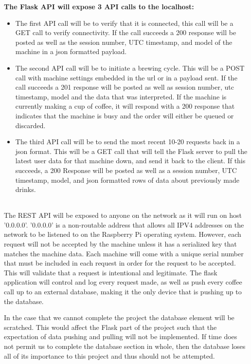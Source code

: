 \documentclass[conference]{IEEEtran}
\begin{document}
\indent\textbf{The Flask API will expose 3 API calls to the localhost:} \\ 
\begin{itemize}
\item The first API call will be to verify that it is connected, this call will
be a GET call to verify connectivity. If the call succeeds a 200 response will
be posted as well as the session number, UTC timestamp, and model of the
machine in a json formatted payload.
\item The second API call will be to initiate a brewing cycle. This will be a
POST call with machine settings embedded in the url or in a payload sent. If the
call succeeds a 201 response will be posted as well as session number, utc
timestamp, model and the data that was interpreted. If the machine is currently
making a cup of coffee, it will respond with a 200 response that indicates that
the machine is busy and the order will either be queued or discarded.
\item The third API call will be to send the most recent 10-20 requests back in
a json format. This will be a GET call that will tell the Flask server to pull
the latest user data for that machine down, and send it back to the client. If
this succeeds, a 200 Response will be posted as well as a session number, UTC
timestamp, model, and json formatted rows of data about previously made drinks.
\end{itemize}
\ \\

The REST API will be exposed to anyone on the network as it will run on host
'0.0.0.0'. '0.0.0.0' is a non-routable address that allows all IPV4 addresses
on the network to be listened to on the Raspberry Pi operating system.
However, each request will not be accepted by the machine unless it has a
serialized key that matches the machine data. Each machine will come with a
unique serial number that must be included in each request in order for the
request to be accepted. This will validate that a request is intentional and
legitimate.
The flask application will control and log every request made, as well as push
every coffee call up to an external database, making it the only device that is
pushing up to the database.

 In the case that we cannot complete the project the database element will be
scratched. This would affect the Flask part of the project such that the
expectation of data pushing and pulling will not be implemented.
If time does not permit us to complete the database section in whole, then the database loses all 
of its importance to this project and thus should not be attempted.
\end{document}
